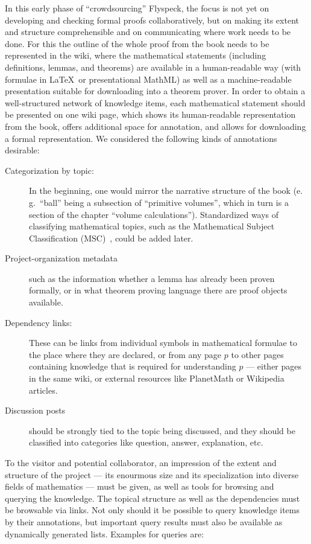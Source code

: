\documentclass{llncs}
\begin{document}
In this early phase of ``crowdsourcing'' Flyspeck, the focus is not yet on developing and
checking formal proofs collaboratively, but on making its extent and structure
comprehensible and on communicating where work needs to be done.  For this the outline of
the whole proof from the book needs to be represented in the wiki, where the
mathematical statements (including definitions, lemmas, and theorems) are available in a
human-readable way (with formulae in \LaTeX\ or presentational MathML) as well as a
machine-readable presentation suitable for downloading into a theorem prover.  In order to
obtain a well-structured network of knowledge items, each mathematical statement should be
presented on one wiki page, which shows its human-readable representation from the book,
offers additional space for annotation, and allows for downloading a formal
representation.  We considered the following kinds of annotations desirable:

\begin{description}
\item[Categorization by topic:] In the beginning, one would mirror the narrative structure
  of the book (e.\,g.\ ``ball'' being a subsection of ``primitive volumes'', which in turn
  is a section of the chapter ``volume calculations'').  Standardized ways of classifying
  mathematical topics, such as the Mathematical Subject Classification
  (MSC)~\cite{AMS:MSC2000}, could be added later.
\item[Project-organization metadata] such as the information whether a lemma has already
  been proven formally, or in what theorem proving language there are proof objects
  available.
\item[Dependency links:] These can be links from individual symbols in mathematical
  formulae to the place where they are declared, or from any page $p$ to other pages
  containing knowledge that is required for understanding $p$ --- either pages in the same
  wiki, or external resources like PlanetMath or Wikipedia articles.
\item[Discussion posts] should be strongly tied to the topic being discussed, and they
  should be classified into categories like question, answer, explanation,
  etc.
\end{description}

To the visitor and potential collaborator, an impression of the extent and structure of
the project --- its enourmous size and its specialization into diverse fields of
mathematics --- must be given, as well as tools for browsing and querying the knowledge.
The topical structure as well as the dependencies must be browsable via links.  Not only
should it be possible to query knowledge items by their annotations, but important query
results must also be available as dynamically generated lists.  Examples for queries are:
\end{document}
